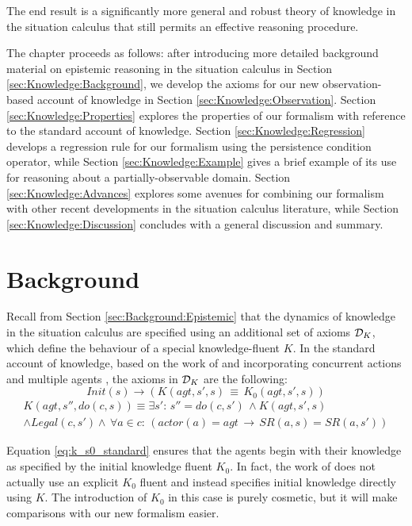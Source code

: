 The end result is a significantly more general and robust theory of
knowledge in the situation calculus that still permits an effective
reasoning procedure.

The chapter proceeds as follows: after introducing more detailed background
material on epistemic reasoning in the situation calculus in Section
\ref{sec:Knowledge:Background}, we develop the axioms for our new
observation-based account of knowledge in Section \ref{sec:Knowledge:Observation}.
Section \ref{sec:Knowledge:Properties} explores the properties of
our formalism with reference to the standard account of knowledge.
Section \ref{sec:Knowledge:Regression} develops a regression rule
for our formalism using the persistence condition operator, while
Section \ref{sec:Knowledge:Example} gives a brief example of its
use for reasoning about a partially-observable domain. Section \ref{sec:Knowledge:Advances}
explores some avenues for combining our formalism with other recent
developments in the situation calculus literature, while Section \ref{sec:Knowledge:Discussion}
concludes with a general discussion and summary.


\section{Background\label{sec:Knowledge:Background}}

Recall from Section \ref{sec:Background:Epistemic} that the dynamics
of knowledge in the situation calculus are specified using an additional
set of axioms $\mathcal{D}_{K}$, which define the behaviour of a special
knowledge-fluent $K$. In the standard account of knowledge, based
on the work of \citet{scherl03sc_knowledge} and incorporating concurrent
actions and multiple agents \citep{shapiro98specifying_ma_systems,scherl03conc_knowledge},
the axioms in $\mathcal{D}_{K}$ are the following:\begin{equation}
Init(s)\rightarrow\left(K(agt,s',s)\,\equiv\, K_{0}(agt,s',s)\right)\label{eq:k_s0_standard}\end{equation}
 \begin{multline}
K(agt,s'',do(c,s))\equiv\exists s':\, s''=do(c,s')\,\wedge K(agt,s',s)\\
\wedge Legal(c,s')\wedge\,\forall a\in c:\,\left(actor(a)=agt\,\rightarrow\, SR(a,s)=SR(a,s')\right)\label{eq:k_ssa_standard}\end{multline}


Equation \eqref{eq:k_s0_standard} ensures that the agents begin with
their knowledge as specified by the initial knowledge fluent $K_{0}$.
In fact, the work of \citep{scherl03sc_knowledge,shapiro98specifying_ma_systems,scherl03conc_knowledge}
does not actually use an explicit $K_{0}$ fluent and instead specifies
initial knowledge directly using $K$. The introduction of $K_{0}$
in this case is purely cosmetic, but it will make comparisons with
our new formalism easier.


